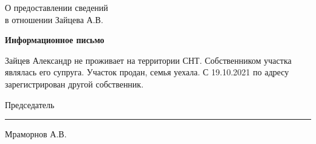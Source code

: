 \begin{flushleft}
О предоставлении сведений\\
в отношении Зайцева  А.В.
\end{flushleft}
\vspace{10mm}
\begin{center}
	\Large\textbf{Информационное письмо}
\end{center}
\par

Зайцев Александр не проживает на территории СНТ. Собственником участка являлась его супруга. Участок продан, семья уехала. С 19.10.2021   по  адресу зарегистрирован другой собственник. 

\vspace{35mm}
Председатель \hfill    \rule{4cm}{0.1 mm}    Мраморнов А.В.





